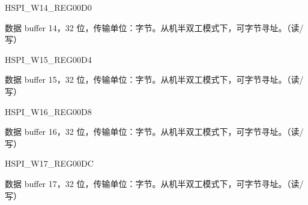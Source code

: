 \begin{register}{H}{SPI\_W14\_REG}{\hexprefix{}00D0}\label{regdesc:SPIW14REG}
%
\regnewline%
\begin{regdesc}\begin{reglist}
\label{fielddesc:SPIBUF14}\item [SPI\_BUF14] 数据 buffer 14，32 位，传输单位：字节。从机半双工模式下，可字节寻址。（读/写）
\end{reglist}\end{regdesc}
\end{register}


\begin{register}{H}{SPI\_W15\_REG}{\hexprefix{}00D4}\label{regdesc:SPIW15REG}
%
\regnewline%
\begin{regdesc}\begin{reglist}
\label{fielddesc:SPIBUF15}\item [SPI\_BUF15] 数据 buffer 15，32 位，传输单位：字节。从机半双工模式下，可字节寻址。（读/写）
\end{reglist}\end{regdesc}
\end{register}


\begin{register}{H}{SPI\_W16\_REG}{\hexprefix{}00D8}\label{regdesc:SPIW16REG}
%
\regnewline%
\begin{regdesc}\begin{reglist}
\label{fielddesc:SPIBUF16}\item [SPI\_BUF16] 数据 buffer 16，32 位，传输单位：字节。从机半双工模式下，可字节寻址。（读/写）
\end{reglist}\end{regdesc}
\end{register}


\begin{register}{H}{SPI\_W17\_REG}{\hexprefix{}00DC}\label{regdesc:SPIW17REG}
%
\regnewline%
\begin{regdesc}\begin{reglist}
\label{fielddesc:SPIBUF17}\item [SPI\_BUF17] 数据 buffer 17，32 位，传输单位：字节。从机半双工模式下，可字节寻址。（读/写）
\end{reglist}\end{regdesc}
\end{register}


